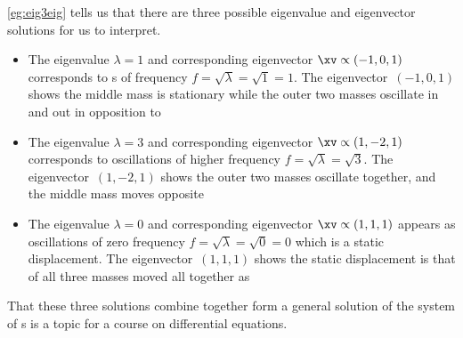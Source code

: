 \begin{reduce}
\begin{example}
\cref{eg:eig3eig} tells us that there are three possible eigenvalue and eigenvector solutions for us to interpret.
\begin{itemize}
\item The eigenvalue \(\lambda=1\) and corresponding eigenvector \(\xv\propto(-1,0,1)\) corresponds to s of frequency \(f=\sqrt\lambda=\sqrt 1=1\).
The eigenvector~\((-1,0,1)\) shows the middle mass is stationary while the outer two masses oscillate in and out in opposition to 
\item The eigenvalue \(\lambda=3\) and corresponding eigenvector \(\xv\propto(1,-2,1)\) corresponds to oscillations of higher frequency \(f=\sqrt\lambda=\sqrt 3\).
The eigenvector~\((1,-2,1)\) shows the outer two masses oscillate together, and the middle mass moves opposite 
\item The eigenvalue \(\lambda=0\) and corresponding eigenvector \(\xv\propto(1,1,1)\) appears as oscillations of zero frequency \(f=\sqrt\lambda=\sqrt 0=0\) which is a static displacement.
The eigenvector~\((1,1,1)\) shows the static displacement is that of all three masses moved all together as 
\end{itemize}
That these three solutions combine together form a general solution of the system of s is a topic for a course on differential equations.
\end{example}
\end{reduce}




